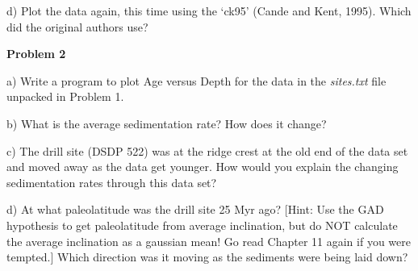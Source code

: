 {d) Plot the data again, this time using the `ck95' (Cande and Kent, 1995).  Which did the original authors use?  

{\bf Problem 2}

a) Write a program to plot Age versus Depth for the data in the {\it sites.txt} file unpacked  in Problem 1.  

b) What is the average sedimentation rate?  How does it change? 

c) The drill site (DSDP 522) was at the ridge crest  at the old end of the data set and moved away as the data get younger.  How would you explain the changing sedimentation rates through this data set? 

d) At what paleolatitude was the drill site 25 Myr ago?  [Hint:  Use the GAD hypothesis to get paleolatitude from average inclination, but do NOT calculate the average inclination as a gaussian mean!  Go read Chapter 11 again if you were tempted.]   Which direction was it moving as the sediments were being laid down?  

}


